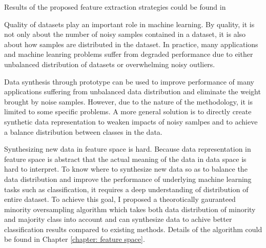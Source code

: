 \documentclass{iitthesis}
\begin{document}
Results of the proposed feature extraction strategies could be found in \cite{7424358}\cite{ZX17:SMAE}



 Quality of datasets play an important role in machine learning. By quality, it is not only about the number of noisy samples contained in a dataset, it is also about how samples are distributed in the dataset. In practice, many applications and machine leanring problems suffer from degraded performance due to either unbalanced distribution of datasets or overwhelming noisy outliers.

Data synthesis through prototype can be used to improve performance of many applications suffering from unbalanced data distribution and eliminate the weight brought by noise samples. However, due to the nature of the methodology, it is limited to some specific problems.  A more general solution is to directly create synthetic data representation to weaken impacts of noisy samlpes and to achieve a balance distribution between classes in the data.

Synthesizing new data in feature space is hard. Because data representation in feature space is abstract that the actual meaning of the data in data space is hard to interpret. To know where to synthesize new data so as to balance the data distribution and improve the performance of underlying machine learning tasks such as classification, it requires a deep understanding of distribution of entire dataset. To achieve this goal, I proposed a theorotically gauranteed minority oversampling algorithm which takes both data distribution of minority and majority class into account and can synthesize data to achive better classification results compared to existing methods. Details of the algorithm could be found in Chapter \ref{chapter: feature space}.
\end{document}
